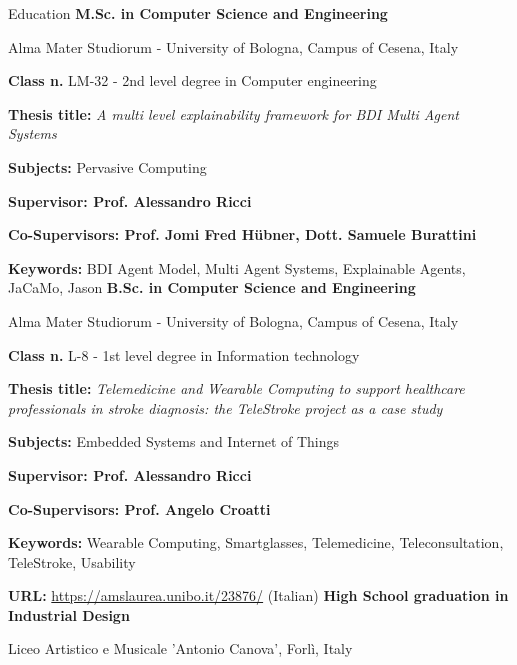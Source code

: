 \begin{rubric}{Education}
%
% 
	\textbf{M.Sc. in Computer Science and Engineering} 
        \par Alma Mater Studiorum - University of Bologna, Campus of Cesena, Italy
        
        \par \textbf{Class n.} LM-32 - 2nd level degree in Computer engineering
	\par \textbf{Thesis title:} \emph{A multi level explainability framework for BDI Multi Agent Systems}
        \par \textbf{Subjects:} Pervasive Computing
        \par \textbf{Supervisor: Prof. Alessandro Ricci}
        \par \textbf{Co-Supervisors: Prof. Jomi Fred H{\"u}bner, Dott. Samuele Burattini}
        \par \textbf{Keywords:} BDI Agent Model, Multi Agent Systems, Explainable Agents, JaCaMo, Jason
% 
\entry*[2018 -- 2021]%
	\textbf{B.Sc. in Computer Science and Engineering} 
        \par Alma Mater Studiorum - University of Bologna, Campus of Cesena, Italy
        
        \par \textbf{Class n.} L-8 - 1st level degree in Information technology
        \par \textbf{Thesis title:} \emph{Telemedicine and Wearable Computing to support healthcare professionals in stroke diagnosis: the TeleStroke project as a case study}
        \par \textbf{Subjects:} Embedded Systems and Internet of Things
        \par \textbf{Supervisor: Prof. Alessandro Ricci}
        \par \textbf{Co-Supervisors: Prof. Angelo Croatti}
        \par\textbf{Keywords:} Wearable Computing, Smartglasses, Telemedicine, Teleconsultation, TeleStroke, Usability
        \par \textbf{URL:} \url{https://amslaurea.unibo.it/23876/} (Italian)
% 
\entry*[2013 -- 2018]%
	\textbf{High School graduation in Industrial Design} 
        \par Liceo Artistico e Musicale 'Antonio Canova', Forlì, Italy
\end{rubric}